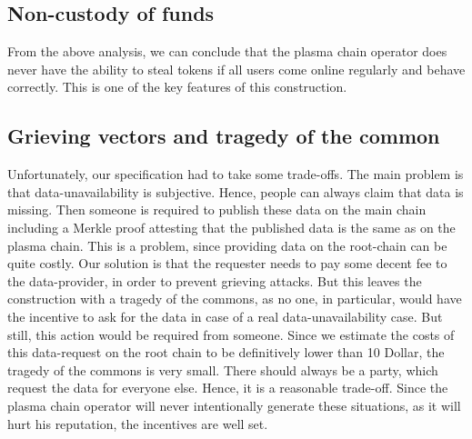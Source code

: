 \documentclass[11pt,parskip=full]{scrartcl}%
\begin{document}
\subsection{Non-custody of funds}
From the above analysis, we can conclude that the plasma chain operator does never have the ability to steal tokens if all users come online regularly and behave correctly. This is one of the key features of this construction.

\subsection{Grieving vectors and tragedy of the common}
Unfortunately, our specification had to take some trade-offs. The main problem is that data-unavailability is subjective. Hence, people can always claim that data is missing. Then someone is required to publish these data on the main chain including a Merkle proof attesting that the published data is the same as on the plasma chain.
This is a problem, since providing data on the root-chain can be quite costly. Our solution is that the requester needs to pay some decent fee to the data-provider, in order to prevent grieving attacks. But this leaves the construction with a tragedy of the commons, as no one, in particular, would have the incentive to ask for the data in case of a real data-unavailability case. But still, this action would be required from someone. \newline 
Since we estimate the costs of this data-request on the root chain to be definitively lower than 10 Dollar, the tragedy of the commons is very small. There should always be a party, which request the data for everyone else. Hence, it is a reasonable trade-off. \newline Since the plasma chain operator will never intentionally generate these situations, as it will hurt his reputation, the incentives are well set. 
\end{document}
